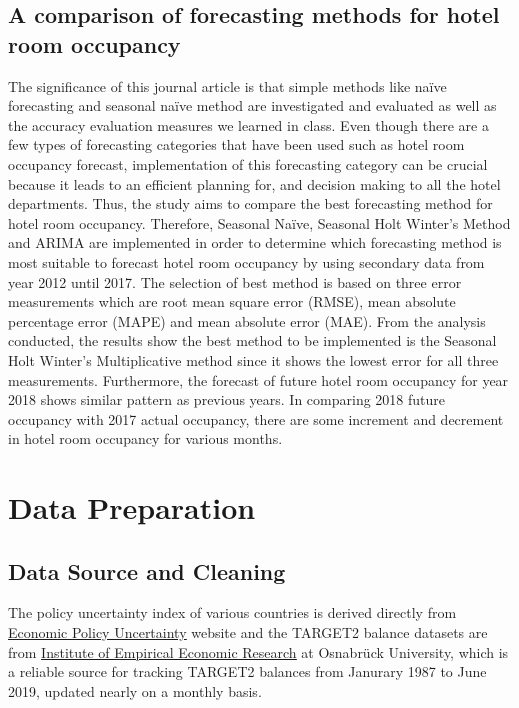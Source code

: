 \documentclass[12pt]{article}
\begin{document}
\subsection{A comparison of forecasting methods for hotel room occupancy}
The significance of this journal article is that simple methods like naïve forecasting and seasonal naïve method are investigated and evaluated as well as the accuracy evaluation measures we learned in class. Even though there are a few types of forecasting categories that have been used such as hotel room occupancy forecast, implementation of this forecasting category can be crucial because it leads to an efficient planning for, and decision making to all the hotel departments. Thus, the study aims to compare the best forecasting method for hotel room occupancy. Therefore, Seasonal Naïve, Seasonal Holt Winter’s Method and ARIMA are implemented in order to determine which forecasting method is most suitable to forecast hotel room occupancy by using secondary data from year 2012 until 2017. The selection of best method is based on three error measurements which are root mean square error (RMSE), mean absolute percentage error (MAPE) and mean absolute error (MAE). From the analysis conducted, the results show the best method to be implemented is the Seasonal Holt Winter’s Multiplicative method since it shows the lowest error for all three measurements. Furthermore, the forecast of future hotel room occupancy for year 2018 shows similar pattern as previous years. In comparing 2018 future occupancy with 2017 actual occupancy, there are some increment and decrement in hotel room occupancy for various months.

\section{Data Preparation} \label{sec:prepare}
\subsection{Data Source and Cleaning}
The policy uncertainty index of various countries is derived directly from \href{https://www.policyuncertainty.com/monetary.html}{\underline{Economic Policy Uncertainty}} website and the TARGET2 balance datasets are from \href{http://www.eurocrisismonitor.com}{\underline{Institute of Empirical Economic Research}} at Osnabrück University, which is a reliable source for tracking TARGET2 balances from Janurary 1987 to June 2019, updated nearly on a monthly basis. 
\end{document}
